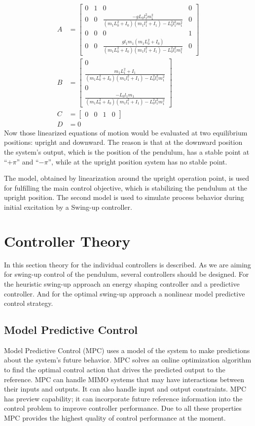 \begin{subequations}\label{linmatrices}
	\begin{align}
	A &=\begin{bmatrix}0&1&0&0\\
	0&0&\frac{-gL_0l_1^2m_1^2}{(m_1L_0^2+I_0)(m_1l_1^2+I_1)-L_0^2l_1^2m_1^2}&0\\
	0&0&0&1\\
	0&0&\frac{gl_1m_1(m_1L_0^2+I_0)}{(m_1L_0^2+I_0)(m_1l_1^2+I_1)-L_0^2l_1^2m_1^2}&0
	\end{bmatrix}\\
	B &=	\begin{bmatrix}
	0\\ 
	\frac{m_1L_1^2+I_1}{(m_1L_0^2+I_0)(m_1l_1^2+I_1)-L_0^2l_1^2m_1^2}\\
	0\\
	\frac{-L_0l_1m_1}{(m_1L_0^2+I_0)(m_1l_1^2+I_1)-L_0^2l_1^2m_1^2}
	\end{bmatrix}\\
	C &= \begin{bmatrix}0&0&1&0\end{bmatrix}\\
	D &= 0
	\end{align}
\end{subequations}
Now those linearized equations of motion would be evaluated at two equilibrium positions: upright and downward. The reason is that at the downward position the system's output, which is the position of the pendulum, has a stable point at “$+\pi$” and “$-\pi$”, while at the upright position system has no stable point.

The model, obtained by linearization around the upright operation point, is used for fulfilling the main control objective, which is stabilizing the pendulum at the upright position. The second model is used to simulate process behavior during initial excitation by a Swing-up controller.
\section{Controller Theory}
In this section theory for the individual controllers is described. As we are aiming for swing-up control of the pendulum, several controllers should be designed. For the heuristic swing-up approach an energy shaping controller and a predictive controller. And for the optimal swing-up approach a nonlinear model predictive control strategy.
\subsection{Model Predictive Control}\label{mpcsection}
Model Predictive Control (MPC) uses a model of the system to make predictions about the system’s future behavior. MPC solves an online optimization algorithm to find the optimal control action that drives the predicted output to the reference. MPC can handle MIMO systems that may have interactions between their inputs and outputs. It can also handle input and output constraints. MPC has preview capability; it can incorporate future reference information into the control problem to improve controller performance. Due to all these properties MPC provides the highest quality of control performance at the moment.
